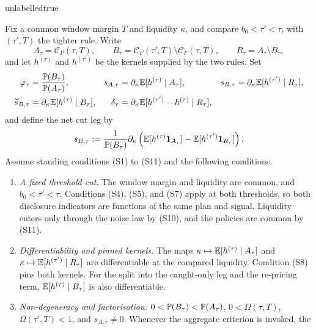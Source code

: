 \csname unlabelledtrue\endcsname
\begin{corollary}
\label{cor:caught-threshold}
Fix a common window margin $T$ and liquidity $\kappa$, and compare $b_0<\tau'<\tau$, with
$(\tau',T)$ the tighter rule. Write
\begin{equation}
\label{eq:caught-tau-sets}
A_\tau=\mathcal C_P(\tau,T),
\qquad
B_\tau=\mathcal C_F(\tau',T)\setminus\mathcal C_F(\tau,T),
\qquad
R_\tau=A_\tau\setminus B_\tau,
\end{equation}
and let $h^{(\tau)}$ and $h^{(\tau')}$ be the kernels supplied by the two rules. Set
\begin{align}
\label{eq:caught-tau-definitions}
\varphi_\tau&=\frac{\mathbb{P}(B_\tau)}{\mathbb{P}(A_\tau)},
&s_{A,\tau}&=\partial_\kappa\mathbb{E}[h^{(\tau)}\mid A_\tau],
&s_{R,\tau}&=\partial_\kappa\mathbb{E}[h^{(\tau')}\mid R_\tau],
\nonumber\\
\widetilde s_{B,\tau}&=\partial_\kappa\mathbb{E}[h^{(\tau)}\mid B_\tau],
&\delta_\tau&=\partial_\kappa\mathbb{E}[h^{(\tau')}-h^{(\tau)}\mid R_\tau],
\end{align}
and define the net cut leg by
\begin{equation}
\label{eq:caught-tau-sB}
s_{B,\tau}:=\frac{1}{\mathbb{P}(B_\tau)}\partial_\kappa\left(
\mathbb{E}[h^{(\tau)}\mathbf{1}_{A_\tau}]
-\mathbb{E}[h^{(\tau')}\mathbf{1}_{R_\tau}]
\right).
\end{equation}
Assume standing conditions (S1) to (S11) and the following conditions.
\begin{enumerate}[label=(C$\tau$-\arabic*),leftmargin=3.8em,itemsep=3pt]
\item \emph{A fixed threshold cut.} The window margin and liquidity are common, and
  $b_0<\tau'<\tau$. Conditions (S4), (S5), and (S7) apply at both thresholds, so both disclosure
  indicators are functions of the same plan and signal. Liquidity enters only through the noise law
  by (S10), and the policies are common by (S11).
\item \emph{Differentiability and pinned kernels.} The maps
  $\kappa\mapsto\mathbb{E}[h^{(\tau)}\mid A_\tau]$ and
  $\kappa\mapsto\mathbb{E}[h^{(\tau')}\mid R_\tau]$ are differentiable at the compared liquidity.
  Condition (S8) pins both kernels. For the split into the caught-only leg and the re-pricing term,
  $\mathbb{E}[h^{(\tau)}\mid B_\tau]$ is also differentiable.
\item \emph{Non-degeneracy and factorisation.}
  $0<\mathbb{P}(B_\tau)<\mathbb{P}(A_\tau)$, $0<\Omega(\tau,T)$,
  $\Omega(\tau',T)<1$, and $s_{A,\tau}\ne0$. Whenever the aggregate criterion is invoked, the

\end{enumerate}
\end{corollary}
